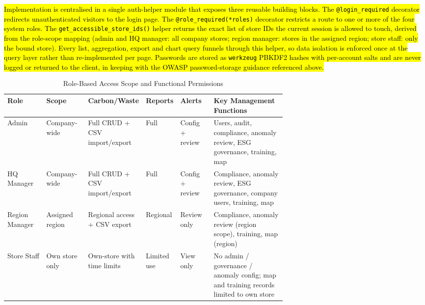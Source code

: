 \documentclass[11pt,a4paper]{article}
\newcommand{\new}[1]{\hl{#1}}
\begin{document}
\new{Implementation is centralised in a single auth-helper module that exposes three reusable building blocks. The \texttt{@login\_required} decorator redirects unauthenticated visitors to the login page. The \texttt{@role\_required(*roles)} decorator restricts a route to one or more of the four system roles. The \texttt{get\_accessible\_store\_ids()} helper returns the exact list of store IDs the current session is allowed to touch, derived from the role-scope mapping (admin and HQ manager: all company stores; region manager: stores in the assigned region; store staff: only the bound store). Every list, aggregation, export and chart query funnels through this helper, so data isolation is enforced once at the query layer rather than re-implemented per page. Passwords are stored as \texttt{werkzeug} PBKDF2 hashes with per-account salts and are never logged or returned to the client, in keeping with the OWASP password-storage guidance referenced above.}

\begin{table}[h]
\centering
\scriptsize
\begin{tabularx}{\linewidth}{@{}p{0.14\linewidth}p{0.15\linewidth}p{0.14\linewidth}p{0.11\linewidth}p{0.12\linewidth}X@{}}
\toprule
\textbf{Role} & \textbf{Scope} & \textbf{Carbon/Waste} & \textbf{Reports} & \textbf{Alerts} & \textbf{Key Management Functions} \\
\midrule
Admin & Company-wide & Full CRUD + CSV import/export & Full & Config + review & Users, audit, compliance, anomaly review, ESG governance, training, map \\
HQ Manager & Company-wide & Full CRUD + CSV import/export & Full & Config + review & Compliance, anomaly review, ESG governance, company users, training, map \\
Region Manager & Assigned region & Regional access + CSV export & Regional & Review only & Compliance, anomaly review (region scope), training, map (region) \\
Store Staff & Own store only & Own-store with time limits & Limited use & View only & No admin / governance / anomaly config; map and training records limited to own store \\
\bottomrule
\end{tabularx}
\caption{Role-Based Access Scope and Functional Permissions}
\end{table}
\end{document}
